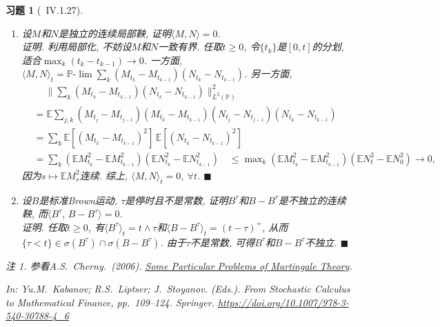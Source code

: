 \documentclass{ctexart}
\theoremstyle{definition}
\theoremstyle{remark}
\newtheorem*{ExRmk}{注}
\theoremstyle{plain}
\newtheorem{Ex}{习题}[section]
\newenvironment{Prf}{\vspace{1ex}\textbf{\\}{\color{red}\textit{证明}}.\normalfont}{\color{red}\hfill$\blacksquare$\vspace{1ex}\par}
\newcommand{\1}{\mathbbm{1}}				%
\renewcommand{\P}{\mathbb{P}}				%
\newcommand{\E}{\mathbb{E}}					%
\newcommand{\agp}[1]{\langle #1 \rangle}	%
\newcommand{\norm}[1]{\lVert#1\rVert}
\newcommand{\tsum}{\textstyle\sum\nolimits}
\begin{document}
\begin{Ex}[\cite{Revuz-Yor}~IV.1.27]
\begin{enumerate}
\setlength{\itemsep}{0ex}
	\item 设$M$和$N$是独立的连续局部鞅, 证明$\agp{M,N} = 0$.
\begin{Prf}
利用局部化, 不妨设$M$和$N$一致有界. 任取$t \ge 0$, 令$\{t_{k}\}$是$[0,t]$的分划, 适合$\max_{k}(t_{k}-t_{k-1}) \to 0$. 一方面, $\agp{M,N}_{t} = \P\text{-}\lim \tsum_{k}(M_{t_{k}}-M_{t_{k-1}})(N_{t_{k}}-N_{t_{k-1}})$. 另一方面, 
\[\begin{aligned}
&\quad\ \norm{\tsum_{k}(M_{t_{k}}-M_{t_{k-1}})(N_{t_{k}}-N_{t_{k-1}})}_{L^{2}(\P)}^{2} \\
&= \E\tsum_{j,k} (M_{t_{j}}-M_{t_{j-1}})(M_{t_{k}}-M_{t_{k-1}})(N_{t_{j}}-N_{t_{j-1}})(N_{t_{k}}-N_{t_{k-1}}) \\
&= \tsum_{k} \E[(M_{t_{k}}-M_{t_{k-1}})^{2}] \, \E[(N_{t_{k}}-N_{t_{k-1}})^{2}] \\
&= \tsum_{k} (\E M_{t_{k}}^{2} - \E M_{t_{k-1}}^{2}) (\E N_{t_{k}}^{2} - \E N_{t_{k-1}}^{2}) \quad
\le \max\nolimits_{k} (\E M_{t_{k}}^{2} - \E M_{t_{k-1}}^{2}) (\E N_{t}^{2} - \E N_{0}^{2}) \to 0 ,
\end{aligned}\]
因为$s \mapsto \E M_{s}^{2}$连续. 综上, $\agp{M,N}_{t} = 0$, $\forall t$.
\end{Prf}
	\item 设$B$是标准Brown运动, $\tau$是停时且不是常数, 证明$B^{\tau}$和$B-B^{\tau}$是\emph{不}独立的连续鞅, 而$\agp{B^{\tau} ,\, B-B^{\tau}} = 0$.
\begin{Prf}
任取$t \ge 0$, 有$\agp{B^{\tau}}_{t} = t\wedge\tau$和$\agp{B-B^{\tau}}_{t} = (t-\tau)^{+}$, 从而$\{\tau<t\} \in \sigma(B^{\tau}) \cap \sigma(B-B^{\tau})$. 由于$\tau$不是常数, 可得$B^\tau$和$B-B^{\tau}$不独立.
\end{Prf}
\end{enumerate}
\begin{ExRmk}
参看A.S.~Cherny.~(2006). \href{http://alexanderchernyy.com/pmt.pdf}{Some Particular Problems of Martingale Theory}. \par\hspace{5em}
In: Yu.M.~Kabanov; R.S.~Liptser; J.~Stoyanov. (Eds.). \emph{From Stochastic Calculus to Mathematical Finance}, pp.~109--124. Springer. \url{https://doi.org/10.1007/978-3-540-30788-4_6}
\end{ExRmk}
\end{Ex}
\end{document}
